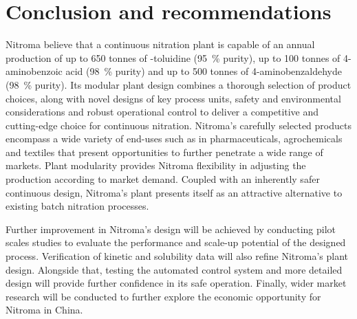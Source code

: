 \section*{Conclusion and recommendations}
Nitroma believe that a continuous nitration plant is capable of an annual production of up to 650 tonnes of \ortho-toluidine (\SI{95}{\percent} purity), up to 100 tonnes of 4-aminobenzoic acid (\SI{98}{\percent} purity) and up to 500 tonnes of 4-aminobenzaldehyde (\SI{98}{\percent} purity). Its modular plant design combines a thorough selection of product choices, along with novel designs of key process units, safety and environmental considerations and robust operational control to deliver a competitive and cutting-edge choice for continuous nitration. Nitroma's carefully selected products encompass a wide variety of end-uses such as in pharmaceuticals, agrochemicals and textiles that present opportunities to further penetrate a wide range of markets. Plant modularity provides Nitroma flexibility in adjusting the production according to market demand. Coupled with an inherently safer continuous design, Nitroma's plant presents itself as an attractive alternative to existing batch nitration processes.

Further improvement in Nitroma's design will be achieved by conducting pilot scales studies to evaluate the performance and scale-up potential of the designed process. Verification of kinetic and solubility data will also refine Nitroma's plant design. Alongside that, testing the automated control system and more detailed design will provide further confidence in its safe operation. Finally, wider market research will be conducted to further explore the economic opportunity for Nitroma in China.

